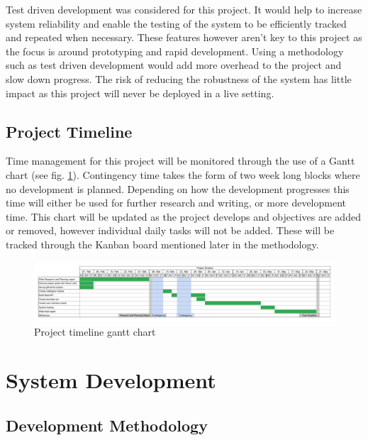 \documentclass[12pt,titlepage]{article}
\begin{document}
  Test driven development was considered for this project. It would help to
  increase system reliability and enable the testing of the system to be
  efficiently tracked and repeated when necessary. These features however aren't
  key to this project as the focus is around prototyping and rapid development.
  Using a methodology such as test driven development would add more overhead to
  the project and slow down progress. The risk of reducing the robustness of the
  system has little impact as this project will never be deployed in a live
  setting.

  \subsection{Project Timeline}

  Time management for this project will be monitored through the use of a Gantt
  chart (see fig. \ref{fig:gantt}). Contingency time takes the form of two week
  long blocks where no development is planned. Depending on how the development
  progresses this time will either be used for further research and writing, or
  more development time. This chart will be updated as the project develops and
  objectives are added or removed, however individual daily tasks will not be
  added. These will be tracked through the Kanban board mentioned later in the
  methodology.

  \clearpage

  \begin{figure}
    \includegraphics[width=\textheight]{../img/gantt.pdf}
    \caption{Project timeline gantt chart}
    \label{fig:gantt}
  \end{figure}

  \clearpage

\section{System Development}

  \subsection{Development Methodology}
\end{document}
